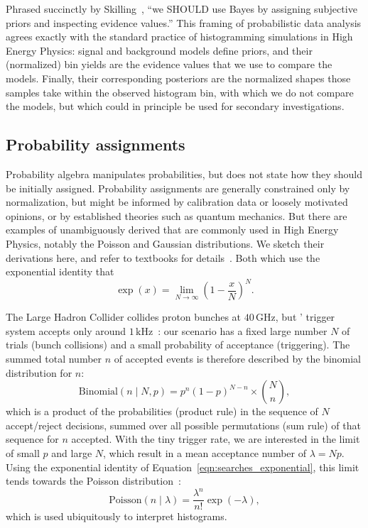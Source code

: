 Phrased succinctly by Skilling~\cite{skilling2008rant},
``we SHOULD use Bayes by assigning subjective priors and inspecting evidence
values.''
This framing of probabilistic data analysis agrees exactly with the standard
practice of histogramming simulations in High Energy Physics:
signal and background models define priors, and their (normalized) bin yields
are the evidence values that we use to compare the models.
Finally, their corresponding posteriors are the normalized shapes those samples
take within the observed histogram bin, with which we do not compare the
models, but which could in principle be used for secondary investigations.


\subsection{Probability assignments}
Probability algebra manipulates probabilities, but does not state how they
should be initially assigned.
Probability assignments are generally constrained only by normalization, but
might be informed by calibration data or loosely motivated opinions,
or by established theories such as quantum mechanics.
But there are examples of unambiguously derived that are commonly used in
High Energy Physics, notably the Poisson and Gaussian distributions.
We sketch their derivations here, and refer to textbooks for
details~\cite{jaynes2003probability}.
Both which use the exponential identity that
\begin{equation}
\label{eqn:searches_exponential}
\exp(x) =
\lim_{N \to \infty}\!
\left(1 - \frac{x}{N}\right)^N
.
\end{equation}

The Large Hadron Collider collides proton bunches at
$40\,\mathrm{GHz}$,
but \atlas' trigger system accepts only around
$1\,\mathrm{kHz}$~\cite{atlas2020trigger}:
our scenario has a fixed large number $N$ of trials
(bunch collisions)
and a small probability of acceptance (triggering).
The summed total number $n$ of accepted events is therefore described by the
binomial distribution for $n$:
\begin{equation}
\label{eqn:searches_binomial}
\mathrm{Binomial}(n\mid N, p) = p^n (1 - p)^{N - n} \times \binom{N}{n}
,
\end{equation}
which is a product of the probabilities (product rule) in the sequence of $N$
accept/reject decisions, summed over all possible permutations (sum rule) of
that sequence for $n$ accepted.
With the tiny trigger rate, we are interested in the limit of small
$p$ and large $N$, which result in a mean acceptance number of $\lambda = Np$.
Using the exponential identity of Equation~\ref{eqn:searches_exponential},
this limit tends towards the Poisson distribution~\cite{jaynes2003probability}:
\begin{equation}
\label{eqn:searches_poisson}
\mathrm{Poisson}(n\mid \lambda) = \frac{\lambda^n}{n!}\exp(-\lambda)
,
\end{equation}
which is used ubiquitously to interpret histograms.

